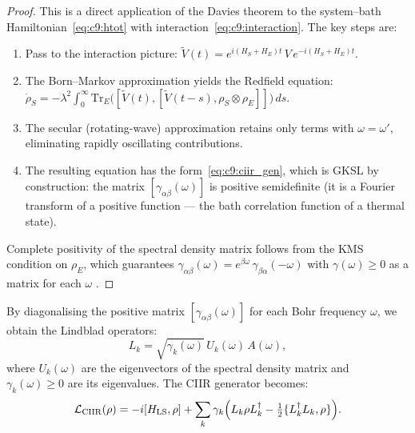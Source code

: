 \begin{proof}
This is a direct application of the Davies theorem \cite{Davies1974,
Davies1976} to the system--bath Hamiltonian~\eqref{eq:c9:htot} with
interaction~\eqref{eq:c9:interaction}.  The key steps are:
\begin{enumerate}
\item Pass to the interaction picture:
  $\tilde{V}(t) = e^{i(H_S + H_E)t}\, V\, e^{-i(H_S + H_E)t}$.
\item The Born--Markov approximation yields the Redfield equation:
  $\dot{\rho}_S = -\lambda^2 \int_0^\infty
    \mathrm{Tr}_E\bigl([\tilde{V}(t), [\tilde{V}(t-s), \rho_S \otimes \rho_E]]\bigr)\, ds$.
\item The secular (rotating-wave) approximation retains only terms with
  $\omega = \omega'$, eliminating rapidly oscillating contributions.
\item The resulting equation has the form~\eqref{eq:c9:ciir_gen}, which is
  GKSL by construction: the matrix $[\gamma_{\alpha\beta}(\omega)]$ is
  positive semidefinite (it is a Fourier transform of a positive function
  — the bath correlation function of a thermal state).
\end{enumerate}
Complete positivity of the spectral density matrix follows from the KMS
condition on $\rho_E$, which guarantees
$\gamma_{\alpha\beta}(\omega) = e^{\beta\omega}\,
\gamma_{\beta\alpha}(-\omega)$ with $\gamma(\omega) \geq 0$ as a matrix
for each $\omega$ \cite{Alicki1976}.
\end{proof}

\begin{corollary}
\label{cor:c9:lindblad}
By diagonalising the positive matrix $[\gamma_{\alpha\beta}(\omega)]$
for each Bohr frequency $\omega$, we obtain the Lindblad operators:
\begin{equation}
  L_k = \sqrt{\gamma_k(\omega)}\, U_k(\omega)\, A(\omega),
  \label{eq:c9:lk}
\end{equation}
where $U_k(\omega)$ are the eigenvectors of the spectral density matrix
and $\gamma_k(\omega) \geq 0$ are its eigenvalues.  The CIIR generator
becomes:
\begin{equation}
  \mathcal{L}_{\mathrm{CIIR}}(\rho) =
    -i[H_{\mathrm{LS}}, \rho]
    + \sum_k \gamma_k \Bigl(
      L_k \rho L_k^\dagger
      - \tfrac{1}{2}\{L_k^\dagger L_k, \rho\}
    \Bigr).
  \label{eq:c9:ciir_final}
\end{equation}
\end{corollary}

